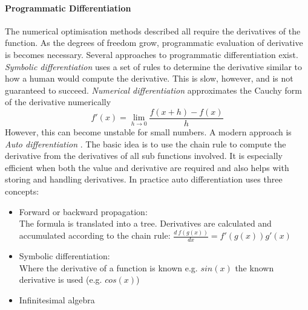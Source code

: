 \documentclass[Master]{subfiles}
\begin{document}
\paragraph{Programmatic Differentiation}
The numerical optimisation methods described all require the derivatives of the function. As the degrees of freedom grow, programmatic evaluation of derivative is becomes necessary. Several approaches to programmatic differentiation exist.
\textit{Symbolic differentiation} uses a set of rules to determine the derivative similar to how a human would compute the derivative. This is slow, however, and is not guaranteed to succeed.
\textit{Numerical differentiation} approximates the Cauchy form of the derivative numerically
$$
f'(x) = \lim_{h \rightarrow 0} \frac{f(x+h)-f(x)}{h} 
$$
However, this can become unstable for small numbers.
A modern approach is \textit{Auto differentiation} \cite{rall1981automatic}. The basic idea is to use the chain rule to compute the derivative from the derivatives of all sub functions involved. 
It is especially efficient when both the value and derivative are required and also helps with storing and handling derivatives. In practice auto differentiation uses three concepts:
\begin{itemize}\label{num:autodiff}
    \item Forward or backward propagation:\\
    The formula is translated into a tree. Derivatives are calculated and accumulated according to the chain rule: $\frac{d \ f(g(x))}{dx} = f'(g(x)) g'(x)$\\
    \item Symbolic differentiation:\\
    Where the derivative of a function is known e.g. $sin(x)$ the known derivative is used (e.g. $cos(x)$)\\
    \item Infinitesimal algebra
\end{itemize}
\end{document}
